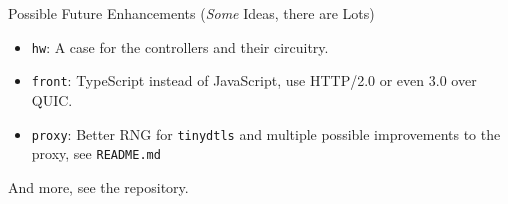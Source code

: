 \documentclass[10pt, xcolor=svgnames]{beamer}
\begin{document}
\begin{frame}{Possible Future Enhancements (\emph{Some} Ideas, there are Lots)}
    \begin{itemize}
        \item \texttt{hw}: A case for the controllers and their circuitry.
        \item \texttt{front}: TypeScript instead of JavaScript, use HTTP/2.0 or even 3.0 over QUIC.
        \item \texttt{proxy}: Better RNG for \texttt{tinydtls} and multiple possible improvements to the proxy, see \texttt{README.md}
    \end{itemize}

    And more, see the repository.
\end{frame}
\end{document}
